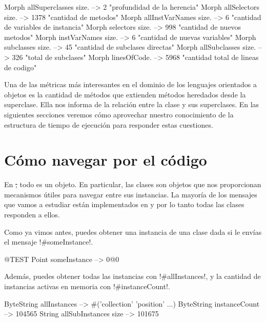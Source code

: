 \documentclass[a4paper,10pt,twoside]{book}
\begin{document}
\begin{code}{}
Morph allSuperclasses size.  -->       2 "profundidad de la herencia"
Morph allSelectors size.        --> 1378 "cantidad de metodos"
Morph allInstVarNames size. -->      6 "cantidad de variables de instancia"
Morph selectors size.             -->  998 "cantidad de nuevos metodos"
Morph instVarNames size.     -->      6 "cantidad de nuevas variables"
Morph subclasses size.          -->    45 "cantidad de subclases directas"
Morph allSubclasses size.      -->  326 "total de subclases"
Morph linesOfCode.               --> 5968 "cantidad total de lineas de codigo"
\end{code}

Una de las m\'etricas m\'as interesantes en el dominio de los lenguajes
orientados a objetos es la cantidad de m\'etodos que extienden m\'etodos
heredados desde la superclase.  Ella nos informa de la relaci\'on entre
la clase y sus superclases.  En las siguientes secciones veremos c\'omo
aprovechar nuestro conocimiento de la estructura de tiempo de
ejecuci\'on para responder estas cuestiones.

\section{C\'omo navegar por el c\'odigo}

En \st, todo es un objeto.  En particular, las clases son objetos que
nos proporcionan mecanismos \'utiles para navegar entre sus instancias.
La mayor\'ia de los mensajes que vamos a estudiar est\'an implementados en
 y por lo tanto todas las clases responden a ellos.

Como ya vimos antes, puedes obtener una instancia de una clase dada si
le env\'ias el mensaje \ct!#someInstance!.
\begin{code}{@TEST} %
Point someInstance --> 0@0
\end{code}

Adem\'as, puedes obtener todas las instancias con \ct!#allInstances!, y
la cantidad de instancias activas en memoria con \ct!#instanceCount!.

\begin{code}{} %
ByteString allInstances        --> #('collection' 'position'  ...)
ByteString instanceCount    --> 104565
String allSubInstances size -->  101675
\end{code}
\end{document}
